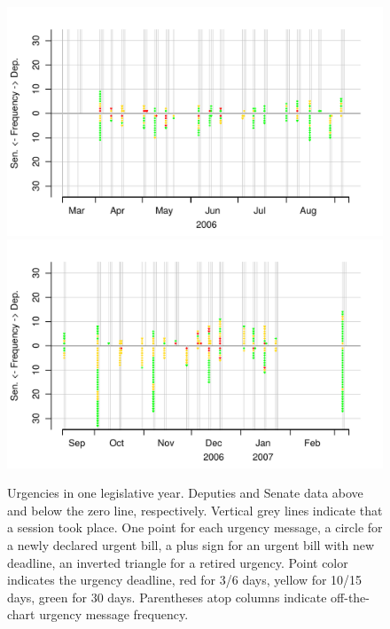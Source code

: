 \documentclass[letter,12pt]{article}
\begin{document}
\begin{figure}
\begin{center}
    \includegraphics[width=\columnwidth]{../graphs/urgencias2006-1.pdf} \\
    \includegraphics[width=\columnwidth]{../graphs/urgencias2006-2.pdf} 
  \caption{Urgencies in one legislative year. Deputies and Senate data above and below the zero line, respectively. Vertical grey lines indicate that a session took place. One point for each urgency message, a circle for a newly declared urgent bill, a plus sign for an urgent bill with new deadline, an inverted triangle for a retired urgency. Point color indicates the urgency deadline, red for 3/6 days, yellow for 10/15 days, green for 30 days. Parentheses atop columns indicate off-the-chart urgency message frequency.}\label{f:depvar}
\end{center}
\end{figure}
\end{document}
